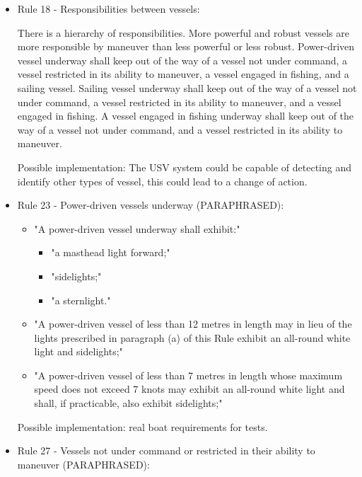 \begin{itemize}
        \item Rule 18 - Responsibilities between vessels:
        
            There is a hierarchy of responsibilities. More powerful and robust vessels are more responsible by maneuver than less powerful or less robust. Power-driven vessel underway shall keep out of the way of a vessel not under command, a vessel restricted in its ability to maneuver, a vessel engaged in fishing, and a sailing vessel. Sailing vessel underway shall keep out of the way of a vessel not under command, a vessel restricted in its ability to maneuver, and a vessel engaged in fishing. A vessel engaged in fishing underway shall keep out of the way of a vessel not under command, and a vessel restricted in its ability to maneuver.
            
            Possible implementation: The \ac{USV} system could be capable of detecting and identify other types of vessel, this could lead to a change of action.
            
        \item Rule 23 - Power-driven vessels underway (PARAPHRASED):
        
            \begin{itemize}
                \item "A power-driven vessel underway shall exhibit:"
                \begin{itemize}
                    \item "a masthead light forward;"
                    \item "sidelights;"
                    \item "a sternlight."
                \end{itemize}   
                \item "A power-driven vessel of less than 12 metres in length may in lieu of the lights prescribed in paragraph (a) of this Rule exhibit an all-round white light and sidelights;"
                \item "A power-driven vessel of less than 7 metres in length whose maximum speed does not exceed 7 knots may exhibit an all-round white light and shall, if practicable, also exhibit sidelights;"
            \end{itemize}
            
            Possible implementation: real boat requirements for tests.
            
        \item Rule 27 - Vessels not under command or restricted in their ability to maneuver (PARAPHRASED):
        

\end{itemize}
